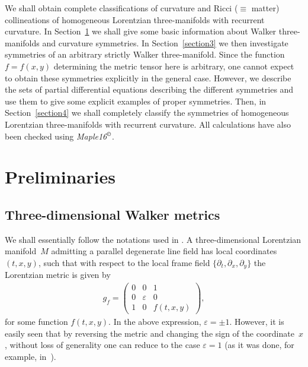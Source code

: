 \documentclass[pdftex]{sigma}
\numberwithin{equation}{section}
\begin{document}
We shall obtain complete classif\/ications of curvature and Ricci ($\equiv$ matter) collineations of homogeneous Lorentzian three-manifolds with recurrent curvature. In Section~\ref{section2} we shall give some basic information about Walker three-manifolds and curvature symmetries. In Section~\ref{section3} we then investigate symmetries of an arbitrary strictly Walker three-manifold. Since the function $f=f(x,y)$ determining the metric tensor here is arbitrary, one cannot expect to obtain these symmetries explicitly in the general case. However, we describe the sets of partial dif\/ferential equations describing the dif\/ferent symmetries and use them to give some explicit examples of proper symmetries. Then, in Section~\ref{section4} we shall completely classify the symmetries of homogeneous Lorentzian three-manifolds with recurrent curvature.
All calculations have also been checked using {\em Maple16$^\copyright$}.

\section{Preliminaries}\label{section2}

\subsection{Three-dimensional Walker metrics}

We shall essentially follow the notations used in \cite{ChGRVA}. A three-dimensional Lorentzian mani\-fold~$M$ admitting a parallel degenerate line f\/ield has local coordinates $(t,x,y)$, such that with respect to the local frame f\/ield
$\{ \partial_t ,\partial_x,\partial_y \}$ the Lorentzian metric is given by
\begin{gather*}
g_f =\left(
\begin{matrix}
0 & 0 & 1 \\
0 & \varepsilon & 0 \\
1 & 0 & f(t,x,y)
\end{matrix}
\right),
\end{gather*}
for some function $f(t,x,y)$. In the above expression, $\varepsilon =\pm 1$. However, it is easily seen that by reversing the metric and changing the sign of the coordinate~$x$, without loss of generality one can reduce to the case $\varepsilon=1$ (as it was done, for example, in~\cite{GGN}).
\end{document}
